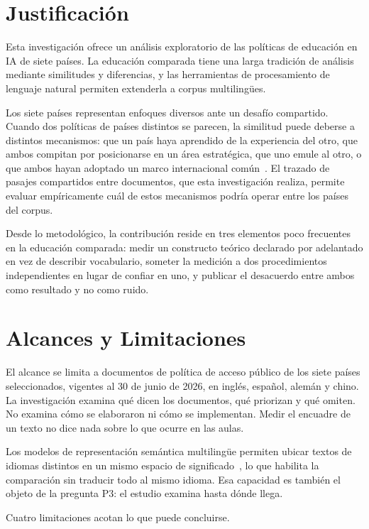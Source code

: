 \section{Justificación}

Esta investigación ofrece un análisis exploratorio de las políticas de educación en IA de siete países. La educación comparada tiene una larga tradición de análisis mediante similitudes y diferencias, y las herramientas de procesamiento de lenguaje natural permiten extenderla a corpus multilingües.

Los siete países representan enfoques diversos ante un desafío compartido. Cuando dos políticas de países distintos se parecen, la similitud puede deberse a distintos mecanismos: que un país haya aprendido de la experiencia del otro, que ambos compitan por posicionarse en un área estratégica, que uno emule al otro, o que ambos hayan adoptado un marco internacional común~\citep{shipan2012diffusion}. El trazado de pasajes compartidos entre documentos, que esta investigación realiza, permite evaluar empíricamente cuál de estos mecanismos podría operar entre los países del corpus.

Desde lo metodológico, la contribución reside en tres elementos poco frecuentes en la educación comparada: medir un constructo teórico declarado por adelantado en vez de describir vocabulario, someter la medición a dos procedimientos independientes en lugar de confiar en uno, y publicar el desacuerdo entre ambos como resultado y no como ruido.


\section{Alcances y Limitaciones}

El alcance se limita a documentos de política de acceso público de los siete países seleccionados, vigentes al 30 de junio de 2026, en inglés, español, alemán y chino. La investigación examina qué dicen los documentos, qué priorizan y qué omiten. No examina cómo se elaboraron ni cómo se implementan. Medir el encuadre de un texto no dice nada sobre lo que ocurre en las aulas.

Los modelos de representación semántica multilingüe permiten ubicar textos de idiomas distintos en un mismo espacio de significado~\citep{reimers2019sentencebert}, lo que habilita la comparación sin traducir todo al mismo idioma. Esa capacidad es también el objeto de la pregunta P3: el estudio examina hasta dónde llega.

Cuatro limitaciones acotan lo que puede concluirse.

